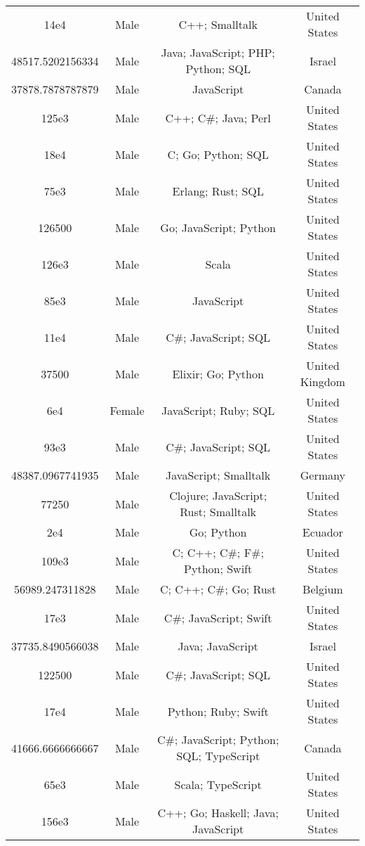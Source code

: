 \begin{center}
\begin{tabular}{ |c|c|c|c| }
14e4  &  Male  &  C++; Smalltalk  &  United States  \\ 
48517.5202156334  &  Male  &  Java; JavaScript; PHP; Python; SQL  &  Israel  \\ 
37878.7878787879  &  Male  &  JavaScript  &  Canada  \\ 
125e3  &  Male  &  C++; C\#; Java; Perl  &  United States  \\ 
18e4  &  Male  &  C; Go; Python; SQL  &  United States  \\ 
75e3  &  Male  &  Erlang; Rust; SQL  &  United States  \\ 
126500  &  Male  &  Go; JavaScript; Python  &  United States  \\ 
126e3  &  Male  &  Scala  &  United States  \\ 
85e3  &  Male  &  JavaScript  &  United States  \\ 
11e4  &  Male  &  C\#; JavaScript; SQL  &  United States  \\ 
37500  &  Male  &  Elixir; Go; Python  &  United Kingdom  \\ 
6e4  &  Female  &  JavaScript; Ruby; SQL  &  United States  \\ 
93e3  &  Male  &  C\#; JavaScript; SQL  &  United States  \\ 
48387.0967741935  &  Male  &  JavaScript; Smalltalk  &  Germany  \\ 
77250  &  Male  &  Clojure; JavaScript; Rust; Smalltalk  &  United States  \\ 
2e4  &  Male  &  Go; Python  &  Ecuador  \\ 
109e3  &  Male  &  C; C++; C\#; F\#; Python; Swift  &  United States  \\ 
56989.247311828  &  Male  &  C; C++; C\#; Go; Rust  &  Belgium  \\ 
17e3  &  Male  &  C\#; JavaScript; Swift  &  United States  \\ 
37735.8490566038  &  Male  &  Java; JavaScript  &  Israel  \\ 
122500  &  Male  &  C\#; JavaScript; SQL  &  United States  \\ 
17e4  &  Male  &  Python; Ruby; Swift  &  United States  \\ 
41666.6666666667  &  Male  &  C\#; JavaScript; Python; SQL; TypeScript  &  Canada  \\ 
65e3  &  Male  &  Scala; TypeScript  &  United States  \\ 
156e3  &  Male  &  C++; Go; Haskell; Java; JavaScript  &  United States  \\ 

\end{tabular}
\end{center}
